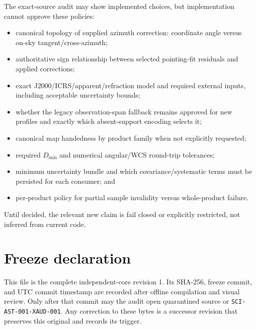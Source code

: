 \documentclass[11pt]{article}
\newcommand{\sha}[1]{\texttt{#1}}
\begin{document}
The exact-source audit may show implemented choices, but implementation cannot
approve these policies:

\begin{itemize}
\item canonical topology of supplied azimuth correction: coordinate angle
versus on-sky tangent/cross-azimuth;
\item authoritative sign relationship between selected pointing-fit residuals
and applied corrections;
\item exact J2000/ICRS/apparent/refraction model and required external inputs,
including acceptable uncertainty bounds;
\item whether the legacy observation-span fallback remains approved for new
profiles and exactly which absent-support encoding selects it;
\item canonical map handedness by product family when not explicitly requested;
\item required $D_{\min}$ and numerical angular/WCS round-trip tolerances;
\item minimum uncertainty bundle and which covariance/systematic terms must be
persisted for each consumer; and
\item per-product policy for partial sample invalidity versus whole-product
failure.
\end{itemize}

Until decided, the relevant new claim is fail closed or explicitly restricted,
not inferred from current code.

\section{Freeze declaration}

This file is the complete independent-core revision 1.  Its SHA-256, freeze
commit, and UTC commit timestamp are recorded after offline compilation and
visual review.  Only after that commit may the audit open quarantined source or
\sha{SCI-AST-001-XAUD-001}.  Any correction to these bytes is a successor
revision that preserves this original and records its trigger.
\end{document}
